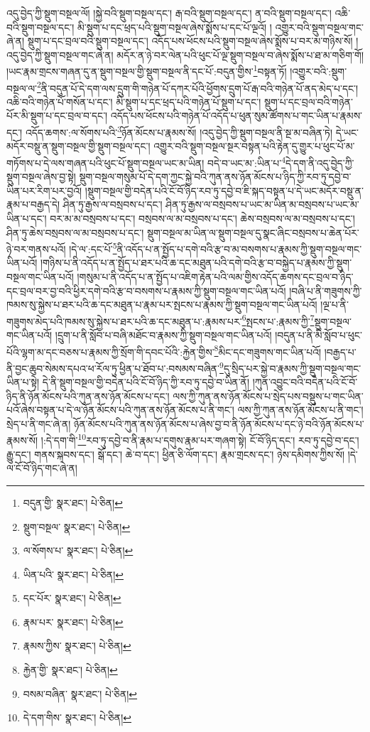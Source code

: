 འདུ་བྱེད་ཀྱི་སྡུག་བསྔལ་ལོ། །སྐྱེ་བའི་སྡུག་བསྔལ་དང་། རྒ་བའི་སྡུག་བསྔལ་དང་། ན་བའི་སྡུག་བསྔལ་དང་། འཆི་བའི་སྡུག་བསྔལ་དང་། མི་སྡུག་པ་དང་ཕྲད་པའི་སྡུག་བསྔལ་ཞེས་སྨོས་པ་དང་པོ་ལྔའོ། །
འགྱུར་བའི་སྡུག་བསྔལ་གང་ཞེ་ན། སྡུག་པ་དང་བྲལ་བའི་སྡུག་བསྔལ་དང་། འདོད་པས་ཕོངས་པའི་སྡུག་བསྔལ་ཞེས་སྨོས་པ་བར་མ་གཉིས་སོ། །འདུ་བྱེད་ཀྱི་སྡུག་བསྔལ་གང་ཞེ་ན། མདོར་ན་ཉེ་བར་ལེན་པའི་ཕུང་པོ་ལྔ་སྡུག་བསྔལ་བ་ཞེས་སྨོས་པ་ཐ་མ་གཅིག་གོ། །ཡང་རྣམ་གྲངས་གཞན་དུ་ན་སྡུག་བསྔལ་གྱི་སྡུག་བསྔལ་ནི་དང་པོ་:བདུན་གྱིས་\footnote{བདུན་གྱི་  སྣར་ཐང་།  པེ་ཅིན། }བསྟན་ཏོ། །འགྱུར་བའི་:སྡུག་བསྔལ་ལ་\footnote{སྡུག་བསྔལ་  སྣར་ཐང་།  པེ་ཅིན། }ནི་བདུན་པོ་དེ་དག་ལས་དྲུག་གི་གཉེན་པོ་དཀར་པོའི་ཕྱོགས་དྲུག་པོ་རྒ་བའི་གཉེན་པོ་ནད་མེད་པ་དང་། འཆི་བའི་གཉེན་པོ་གསོན་པ་དང་། མི་སྡུག་པ་དང་ཕྲད་པའི་གཉེན་པོ་སྡུག་པ་དང་། སྡུག་པ་དང་བྲལ་བའི་གཉེན་པོར་མི་སྡུག་པ་དང་བྲལ་བ་དང་། འདོད་པས་ཕོངས་པའི་གཉེན་པོ་འདོད་པ་ཕུན་སུམ་ཚོགས་པ་གང་ཡིན་པ་རྣམས་དང་། འདོད་ཆགས་:ལ་སོགས་པའི་\footnote{ལ་སོགས་པ་  སྣར་ཐང་།  པེ་ཅིན། }ཉོན་མོངས་པ་རྣམས་སོ། །འདུ་བྱེད་ཀྱི་སྡུག་བསྔལ་ནི་སྔ་མ་བཞིན་ཏེ། དེ་ཡང་མདོར་བསྡུ་ན་སྡུག་བསྔལ་གྱི་སྡུག་བསྔལ་དང་། འགྱུར་བའི་སྡུག་བསྔལ་སྔར་བསྟན་པའི་རྟེན་དུ་གྱུར་པ་ཕུང་པོ་མ་གཏོགས་པ་དེ་ལས་གཞན་པའི་ཕུང་པོ་སྡུག་བསྔལ་ཡང་མ་ཡིན། བདེ་བ་ཡང་མ་:ཡིན་པ་\footnote{ཡིན་པའི་  སྣར་ཐང་།  པེ་ཅིན། }དེ་དག་ནི་འདུ་བྱེད་ཀྱི་སྡུག་བསྔལ་ཞེས་བྱ་སྟེ། སྡུག་བསྔལ་གསུམ་པོ་དེ་དག་ཀྱང་སྐྱེ་བའི་ཀུན་ནས་ཉོན་མོངས་པ་ཉིད་ཀྱི་རབ་ཏུ་དབྱེ་བ་ཡིན་པར་རིག་པར་བྱའོ། །སྡུག་བསྔལ་གྱི་བདེན་པའི་ངོ་བོ་ཉིད་རབ་ཏུ་དབྱེ་བ་ཇི་སྐད་བསྟན་པ་དེ་ཡང་མདོར་བསྡུ་ན་རྣམ་པ་བརྒྱད་དེ། ཤིན་ཏུ་རྒྱས་ལ་བསྲབས་པ་དང་། ཤིན་ཏུ་རྒྱས་ལ་བསྲབས་པ་ཡང་མ་ཡིན་མ་བསྲབས་པ་ཡང་མ་ཡིན་པ་དང་། བར་མ་མ་བསྲབས་པ་དང་། བསྲབས་ལ་མ་བསྲབས་པ་དང་། ཆེས་བསྲབས་ལ་མ་བསྲབས་པ་དང་། ཤིན་ཏུ་ཆེས་བསྲབས་ལ་མ་བསྲབས་པ་དང་། སྡུག་བསྔལ་མ་ཡིན་ལ་སྡུག་བསྔལ་དུ་སྣང་ཞིང་བསྲབས་པ་ཆེན་པོར་ཉེ་བར་གནས་པའོ། །དེ་ལ་:དང་པོ་\footnote{དང་པོར་  སྣར་ཐང་།  པེ་ཅིན། }ནི་འདོད་པ་ན་སྤྱོད་པ་དགེ་བའི་རྩ་བ་མ་བསགས་པ་རྣམས་ཀྱི་སྡུག་བསྔལ་གང་ཡིན་པའོ། །གཉིས་པ་ནི་འདོད་པ་ན་སྤྱོད་པ་ཐར་པའི་ཆ་དང་མཐུན་པའི་དགེ་བའི་རྩ་བ་བསྐྱེད་པ་རྣམས་ཀྱི་སྡུག་བསྔལ་གང་ཡིན་པའོ། །གསུམ་པ་ནི་འདོད་པ་ན་སྤྱོད་པ་འཇིག་རྟེན་པའི་ལམ་གྱིས་འདོད་ཆགས་དང་བྲལ་བ་ཉིད་དང་བྲལ་བར་བྱ་བའི་ཕྱིར་དགེ་བའི་རྩ་བ་བསགས་པ་རྣམས་ཀྱི་སྡུག་བསྔལ་གང་ཡིན་པའོ། །བཞི་པ་ནི་གཟུགས་ཀྱི་ཁམས་སུ་སྐྱེས་པ་ཐར་པའི་ཆ་དང་མཐུན་པ་རྣམ་པར་སྤངས་པ་རྣམས་ཀྱི་སྡུག་བསྔལ་གང་ཡིན་པའོ། །ལྔ་པ་ནི་གཟུགས་མེད་པའི་ཁམས་སུ་སྐྱེས་པ་ཐར་པའི་ཆ་དང་མཐུན་པ་:རྣམས་པར་\footnote{རྣམ་པར་  སྣར་ཐང་།  པེ་ཅིན། }སྤངས་པ་:རྣམས་ཀྱི་\footnote{རྣམས་ཀྱིས་  སྣར་ཐང་།  པེ་ཅིན། }སྡུག་བསྔལ་གང་ཡིན་པའོ། །དྲུག་པ་ནི་སློབ་པ་བཞི་མཐོང་བ་རྣམས་ཀྱི་སྡུག་བསྔལ་གང་ཡིན་པའོ། །བདུན་པ་ནི་མི་སློབ་པ་ཕུང་པོའི་ལྷག་མ་དང་བཅས་པ་རྣམས་ཀྱི་སྲོག་གི་དབང་པོའི་:རྐྱེན་གྱིས་\footnote{རྐྱེན་གྱི་  སྣར་ཐང་།  པེ་ཅིན། }མིང་དང་གཟུགས་གང་ཡིན་པའོ། །བརྒྱད་པ་ནི་བྱང་ཆུབ་སེམས་དཔའ་ཕ་རོལ་ཏུ་ཕྱིན་པ་ཐོབ་པ་:བསམས་བཞིན་\footnote{བསམ་བཞིན་  སྣར་ཐང་།  པེ་ཅིན། }དུ་སྲིད་པར་སྐྱེ་བ་རྣམས་ཀྱི་སྡུག་བསྔལ་གང་ཡིན་པ་སྟེ། དེ་ནི་སྡུག་བསྔལ་གྱི་བདེན་པའི་ངོ་བོ་ཉིད་ཀྱི་རབ་ཏུ་དབྱེ་བ་ཡིན་ནོ། །ཀུན་འབྱུང་བའི་བདེན་པའི་ངོ་བོ་ཉིད་ནི་ཉོན་མོངས་པའི་ཀུན་ནས་ཉོན་མོངས་པ་དང་། ལས་ཀྱི་ཀུན་ནས་ཉོན་མོངས་པ་སྲེད་པས་བསྡུས་པ་གང་ཡིན་པའོ་ཞེས་བསྟན་པ་དེ་ལ་ཉོན་མོངས་པའི་ཀུན་ནས་ཉོན་མོངས་པ་ནི་གང་། ལས་ཀྱི་ཀུན་ནས་ཉོན་མོངས་པ་ནི་གང་། སྲེད་པ་ནི་གང་ཞེ་ན། ཉོན་མོངས་པའི་ཀུན་ནས་ཉོན་མོངས་པ་ཞེས་བྱ་བ་ནི་ཉོན་མོངས་པ་དང་ཉེ་བའི་ཉོན་མོངས་པ་རྣམས་སོ། །:དེ་དག་གི་\footnote{དེ་དག་གིས་  སྣར་ཐང་།  པེ་ཅིན། }རབ་ཏུ་དབྱེ་བ་ནི་རྣམ་པ་དགུས་རྣམ་པར་གཞག་སྟེ། ངོ་བོ་ཉིད་དང་། རབ་ཏུ་དབྱེ་བ་དང་། རྒྱུ་དང་། གནས་སྐབས་དང་། སྒོ་དང་། ཆེ་བ་དང་། ཕྱིན་ཅི་ལོག་དང་། རྣམ་གྲངས་དང་། ཉེས་དམིགས་ཀྱིས་སོ། །དེ་ལ་ངོ་བོ་ཉིད་གང་ཞེ་ན། 